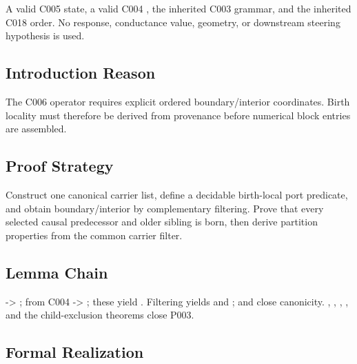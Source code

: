 A valid C005 state, a valid C004 \texttt{\protect{}}, the inherited
C003 grammar, and the inherited C018 order. No response, conductance
value, geometry, or downstream steering hypothesis is used.

\subsection{Introduction Reason}\label{introduction-reason-17}

The C006 operator requires explicit ordered boundary/interior
coordinates. Birth locality must therefore be derived from provenance
before numerical block entries are assembled.

\subsection{Proof Strategy}\label{proof-strategy-4}

Construct one canonical carrier list, define a decidable birth-local
port predicate, and obtain boundary/interior by complementary filtering.
Prove that every selected causal predecessor and older sibling is born,
then derive partition properties from the common carrier filter.

\subsection{Lemma Chain}\label{lemma-chain-4}

\texttt{\protect{}} -\textgreater{}
\texttt{\protect{}};
\texttt{\protect{}} from C004 -\textgreater{}
\texttt{\protect{}}; these yield
\texttt{\protect{}}. Filtering yields \texttt{\protect{}} and
\texttt{\protect{}}; \texttt{\protect{}} and
\texttt{\protect{}} close canonicity. \texttt{\protect{}},
\texttt{\protect{}}, \texttt{\protect{}},
\texttt{\protect{}}, and the child-exclusion theorems close P003.

\subsection{Formal Realization}\label{formal-realization-4}

